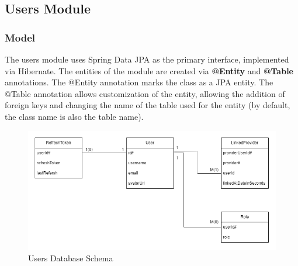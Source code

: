\subsection{Users Module}

\subsubsection{Model}

\noindent The users module uses Spring Data JPA as the primary interface, implemented via Hibernate. The entities of the module are created via \textbf{@Entity} and \textbf{@Table} annotations. The @Entity annotation marks the class as a JPA entity. The @Table annotation allows customization of the entity, allowing the addition of foreign keys and changing the name of the table used for the entity (by default, the class name is also the table name).

\begin{figure}[h]
    \centering
    \includegraphics[scale=0.6]{images/users-schema.png}
    \caption{Users Database Schema}
    \label{fig:figure4}
\end{figure}

